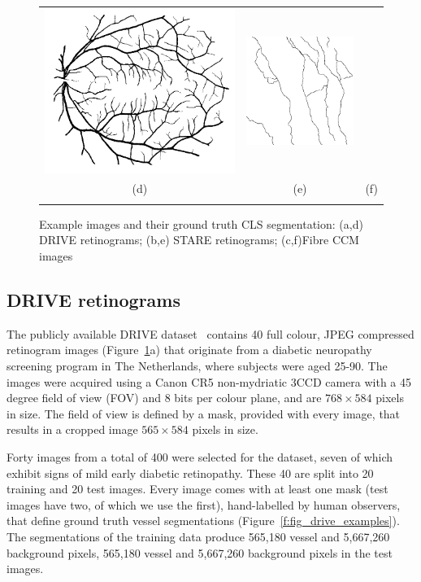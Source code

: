 \documentclass{IEEEtran}
\newcommand{\fref}[1]{Figure~\ref{#1}}
\def\by{\ensuremath{\times}}
\begin{document}
\begin{figure}[t]
\begin{tabular}{@{}c c c@{}}
\includegraphics[width=0.3\columnwidth]{figs/retina/17_stare_v_mask} &
\includegraphics[width=0.3\columnwidth]{figs/fibre/04_fibre_gt} \\
(d) & (e) & (f) \\
\noalign{\smallskip}
\end{tabular}
%
\caption{Example images and their ground truth CLS segmentation: (a,d) DRIVE retinograms; (b,e) STARE retinograms; (c,f)Fibre CCM images }
\label{f:image_examples}
\end{figure}
%
\subsection{DRIVE retinograms}
\label{s:dataset_drive}
The publicly available DRIVE dataset~\cite{Staal_etal_TMI04} contains 40 full colour, JPEG compressed retinogram images (\fref{f:image_examples}a) that originate from a diabetic neuropathy screening program in The Netherlands, where subjects were aged 25-90. The images were acquired using a Canon CR5 non-mydriatic 3CCD camera with a 45 degree field of view (FOV) and 8 bits per colour plane, and are $768 \by 584$ pixels in size. The field of view is defined by a mask, provided with every image, that results in a cropped image $565 \by 584$ pixels in size.

Forty images from a total of 400 were selected for the dataset, seven of which exhibit signs of mild early diabetic retinopathy. These 40 are split into 20 training and 20 test images. Every image comes with at least one mask (test images have two, of which we use the first), hand-labelled by human observers, that define ground truth vessel segmentations (\fref{f:fig_drive_examples}). The segmentations of the training data produce 565,180 vessel and 5,667,260 background pixels, 565,180 vessel and 5,667,260 background pixels in the test images.
\end{document}
